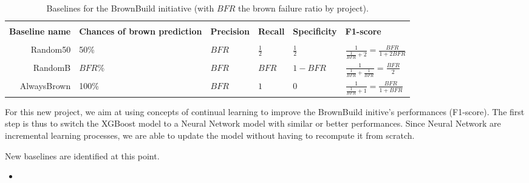\begin{table*}[h!]
	\centering
	\caption{\label{brownbuild:baselines} Baselines for the BrownBuild initiative (with $BFR$ the brown failure ratio by project). }
	\begin{tabular}{|r|l|l|l|l|l|}
		\hline
		\\[-1em]
		\textbf{Baseline name}& \textbf{Chances of brown prediction}& \textbf{Precision} & \textbf{Recall} & \textbf{Specificity} & \textbf{F1-score}\\
		\hline
		\\[-1em]
		Random50   &50\%&$BFR$&$\frac{1}{2}$&$\frac{1}{2}$&$\frac{1}{\frac{1}{BFR}+2} = \frac{BFR}{1+2BFR}$\\%
		RandomB    &$BFR$\%&$BFR$&$BFR$          &$1-BFR$&$\frac{1}{\frac{1}{BFR}+\frac{1}{BFR}} = \frac{BFR}{2}$\\%
		AlwaysBrown&100\%&$BFR$&$1$          &$0$&$\frac{1}{\frac{1}{BFR}+1} = \frac{BFR}{1+BFR}$\\			
		\hline
	\end{tabular}
\end{table*}


For this new project, we aim at using concepts of continual learning to improve the BrownBuild initive's performances (F1-score). The first step is thus to switch the XGBoost model to a Neural Network model with similar or better performances. Since Neural Network are incremental learning processes, we are able to update the model without having to recompute it from scratch.

New baselines are identified at this point. 
\begin{itemize}
	\item 
\end{itemize}

